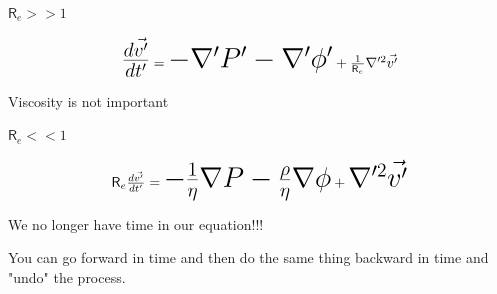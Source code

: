 \documentclass[]{beamer}
\begin{document}
  
   \begin{frame}
$\mathsf{R}_e>>1 $    

   
     \begin{equation*}
      \mbox{\fontsize{20}{20}\selectfont\( \frac{d\vec{v'}}{dt'}
      \)} = \mbox{\fontsize{20}{20}\selectfont\(-\nabla' P' -\nabla' \phi' \)} + \mbox{\fontsize{10}{10}\selectfont\( \frac{1}{\mathsf{R}_e} \nabla'^2 \vec{v'} \)}
       \end{equation*}
       \pause

       \vspace{5mm}
   
   \textcolor{mypink1}{Viscosity is not important}

       \end{frame}
  
       

\begin{frame}
    $\mathsf{R}_e<<1 $    
    
       
         \begin{equation*}
          \mbox{\fontsize{10}{10}\selectfont\( \mathsf{R}_e\frac{d\vec{v'}}{dt'}
          \)} = \mbox{\fontsize{20}{20}\selectfont\(-\frac{1}{\eta}\nabla P -\frac{\rho}{\eta}\nabla \phi \)} + \mbox{\fontsize{20}{20}\selectfont\(  \nabla'^2 \vec{v'} \)}
           \end{equation*}
      
    \pause

    \vspace{5mm}

\textcolor{mypink1}{We no longer have time in our equation!!!}

\pause

\vspace{2mm}

\textcolor{mypink1}{You can go forward in time and then do the same thing backward in time and  "undo" the process.}

\end{frame}

     
\end{document}
